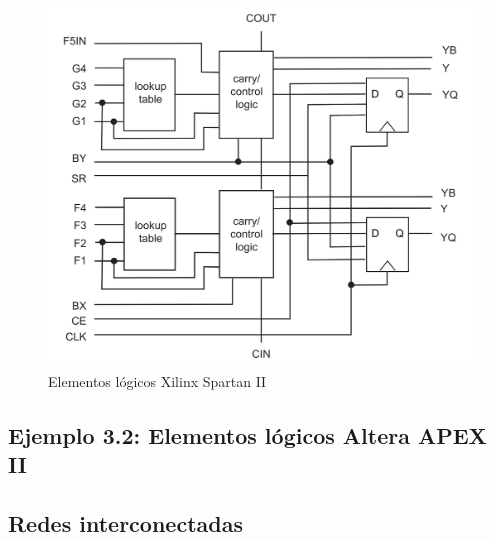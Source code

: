 \begin{figure}[H] \centering
    \includegraphics[width=0.6\linewidth]{Imagenes/03-Xilinx_Spartan_II.png}
    \caption{Elementos lógicos Xilinx Spartan II}%
    \label{Fig:03-Xilinx-Spartan-II}
\end{figure}

\vspace*{1em}

\begin{Enunciado}
\subsection*{Ejemplo 3.2: Elementos lógicos Altera APEX II}
\end{Enunciado}


\subsection{Redes interconectadas}